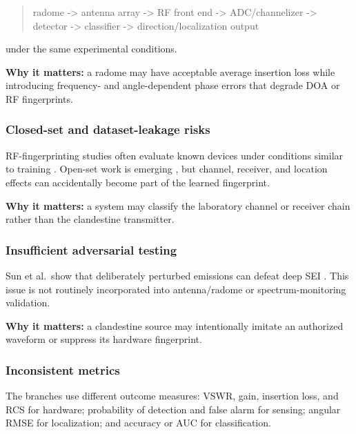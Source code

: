 \documentclass[
  10pt,
]{article}
\begin{document}
\begin{quote}
radome -\textgreater{} antenna array -\textgreater{} RF front end
-\textgreater{} ADC/channelizer -\textgreater{} detector -\textgreater{}
classifier -\textgreater{} direction/localization output
\end{quote}

under the same experimental conditions.

\textbf{Why it matters:} a radome may have acceptable average insertion
loss while introducing frequency- and angle-dependent phase errors that
degrade DOA or RF fingerprints.

\subsubsection{Closed-set and dataset-leakage
risks}\label{closed-set-and-dataset-leakage-risks}

RF-fingerprinting studies often evaluate known devices under conditions
similar to training \citep{jagannath2022, soltanieh2020}. Open-set work
is emerging \citep{zhang2025open}, but channel, receiver, and location
effects can accidentally become part of the learned fingerprint.

\textbf{Why it matters:} a system may classify the laboratory channel or
receiver chain rather than the clandestine transmitter.

\subsubsection{Insufficient adversarial
testing}\label{insufficient-adversarial-testing}

Sun et al.~show that deliberately perturbed emissions can defeat deep
SEI \citep{sun2022}. This issue is not routinely incorporated into
antenna/radome or spectrum-monitoring validation.

\textbf{Why it matters:} a clandestine source may intentionally imitate
an authorized waveform or suppress its hardware fingerprint.

\subsubsection{Inconsistent metrics}\label{inconsistent-metrics}

The branches use different outcome measures: VSWR, gain, insertion loss,
and RCS for hardware; probability of detection and false alarm for
sensing; angular RMSE for localization; and accuracy or AUC for
classification.
\end{document}
